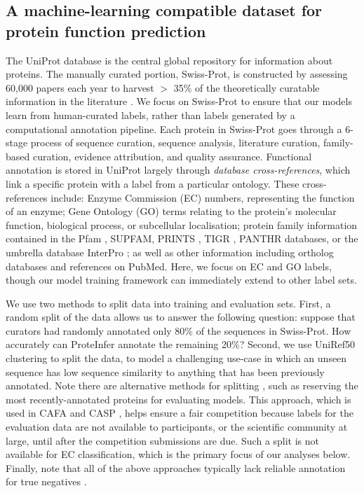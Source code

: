\subsection*{A machine-learning compatible dataset for protein function prediction}
The UniProt database is the central global repository for information about proteins. The manually curated portion, Swiss-Prot, is constructed by assessing $~$60,000 papers each year to harvest $\gt$ 35\% of the theoretically curatable information in the literature \cite{uniprotlatest}. We focus on Swiss-Prot to ensure that our models learn from human-curated labels, rather than labels generated by a computational annotation pipeline. Each protein in Swiss-Prot goes through a 6-stage process of sequence curation, sequence analysis, literature curation, family-based curation, evidence attribution, and quality assurance.
Functional annotation is stored in UniProt largely through \textit{database cross-references}, which link a specific protein with a label from a particular ontology. These cross-references include: Enzyme Commission (EC) numbers, representing the function of an enzyme; Gene Ontology (GO) terms relating to the protein's molecular function, biological process, or subcellular localisation; protein family information contained in the Pfam \citep{pfamlatest}, SUPFAM\citep{supfamlatest}, PRINTS \citep{prints}, TIGR \citep{tigr}, PANTHR \citep{panther} databases, or the umbrella database InterPro \citep{interpro}; as well as other information including ortholog databases and references on PubMed. Here, we focus on EC and GO labels, though our model training framework can immediately extend to other label sets.

We use two methods to split data into training and evaluation sets. First, a random split of the data allows us to answer the following question: suppose that curators had randomly annotated only 80\% of the sequences in Swiss-Prot. How accurately can ProteInfer annotate the remaining 20\%?  Second, we use UniRef50 \citep{suzek2015uniref} clustering to split the data, to model a challenging use-case in which an unseen sequence has low sequence similarity to anything that has been previously annotated. Note there are alternative methods for splitting \citep{Brandes2021,zhou2019cafa, gillis}, such as reserving the most recently-annotated proteins for evaluating models. This approach, which is used in CAFA and CASP \citep{zhou2019cafa, gillis}, helps ensure a fair competition because labels for the evaluation data are not available to participants, or the scientific community at large, until after the competition submissions are due. Such a split is not available for EC classification, which is the primary focus of our analyses below. Finally, note that all of the above approaches typically lack reliable annotation for true negatives \citep{warwick2020benchmarking}.

